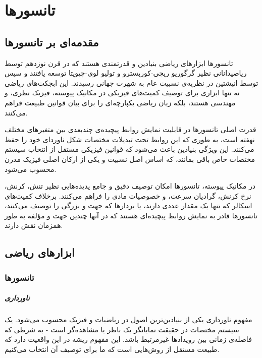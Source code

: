 \chapter{تانسورها}

\section{مقدمه‌ای بر تانسورها}

تانسورها ابزارهای ریاضی بنیادین و قدرتمندی هستند که در قرن نوزدهم توسط ریاضیدانانی نظیر گرگوریو ریچی-کوربسترو و تولیو لوی-چیویتا توسعه یافتند و سپس توسط انیشتین در نظریه‌ی نسبیت عام به شهرت جهانی رسیدند. این ابجکت‌های ریاضی نه تنها ابزاری برای توصیف کمیت‌های فیزیکی در مکانیک پیوسته، فیزیک نظری، و مهندسی هستند، بلکه زبان ریاضی یکپارچه‌ای را برای بیان قوانین طبیعت فراهم می‌کنند.

قدرت اصلی تانسورها در قابلیت نمایش روابط پیچیده‌ی چندبعدی بین متغیرهای مختلف نهفته است، به طوری که این روابط تحت تبدیلات مختصات شکل ناوردای خود را حفظ می‌کنند. این ویژگی بنیادین باعث می‌شود که قوانین فیزیکی مستقل از انتخاب سیستم مختصات خاص باقی بمانند، که اساس اصل نسبیت و یکی از ارکان اصلی فیزیک مدرن محسوب می‌شود.

در مکانیک پیوسته، تانسورها امکان توصیف دقیق و جامع پدیده‌هایی نظیر تنش، کرنش، نرخ کرنش، گرادیان سرعت، و خصوصیات مادی را فراهم می‌کنند. برخلاف کمیت‌های اسکالر که تنها یک مقدار عددی دارند، یا بردارها که جهت و بزرگی را توصیف می‌کنند، تانسورها قادر به نمایش روابط پیچیده‌ای هستند که در آنها چندین جهت و مؤلفه به طور همزمان نقش دارند.

\section{ابزارهای ریاضی}

\subsection{تانسورها}

\paragraph{ناورداری} مفهوم ناورداری یکی از بنیادین‌ترین اصول در ریاضیات و فیزیک محسوب می‌شود. یک سیستم مختصات در حقیقت نمایانگر یک ناظر یا مشاهده‌گر است - به شرطی که فاصله‌ی زمانی بین رویدادها غیرمرتبط باشد. این مفهوم ریشه در این واقعیت دارد که طبیعت مستقل از روش‌هایی است که ما برای توصیف آن انتخاب می‌کنیم.

